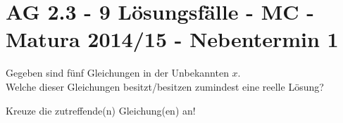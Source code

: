 \section{AG 2.3 - 9 Lösungsfälle - MC - Matura 2014/15 - Nebentermin 1}

\begin{beispiel}[AG 2.3]{1} %
				Gegeben sind fünf Gleichungen in der Unbekannten $x$.\\
				
				Welche dieser Gleichungen besitzt/besitzen zumindest eine reelle Lösung?
				
				Kreuze die zutreffende(n) Gleichung(en) an!
				
\end{beispiel}